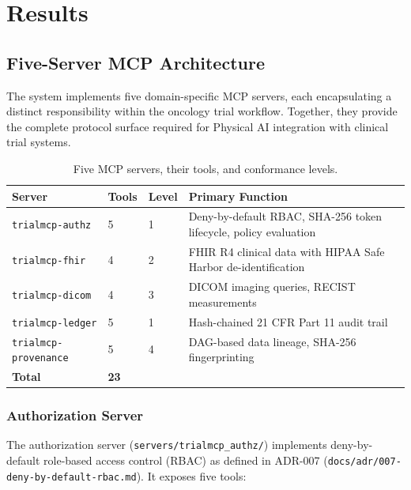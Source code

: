\section{Results}
\label{sec:results}

\subsection{Five-Server MCP Architecture}

The system implements five domain-specific MCP servers, each encapsulating a distinct responsibility within the oncology trial workflow. Together, they provide the complete protocol surface required for Physical AI integration with clinical trial systems.

\begin{table}[H]
\centering
\caption{Five MCP servers, their tools, and conformance levels.}
\label{tab:five-servers}
\footnotesize
\begin{tabularx}{\textwidth}{@{}L{3.2cm}C{0.8cm}C{1.0cm}L{6.8cm}@{}}
\toprule
\textbf{Server} & \textbf{Tools} & \textbf{Level} & \textbf{Primary Function} \\
\midrule
\texttt{trialmcp-authz} & 5 & 1 & Deny-by-default RBAC, SHA-256 token lifecycle, policy evaluation \\
\texttt{trialmcp-fhir} & 4 & 2 & FHIR R4 clinical data with HIPAA Safe Harbor de-identification \\
\texttt{trialmcp-dicom} & 4 & 3 & DICOM imaging queries, RECIST~\cite{eisenhauer2009recist} measurements \\
\texttt{trialmcp-ledger} & 5 & 1 & Hash-chained 21 CFR Part 11 audit trail \\
\texttt{trialmcp-provenance} & 5 & 4 & DAG-based data lineage, SHA-256 fingerprinting \\
\midrule
\textbf{Total} & \textbf{23} & & \\
\bottomrule
\end{tabularx}
\end{table}

\subsubsection{Authorization Server}

The authorization server (\texttt{servers/trialmcp\_authz/}) implements deny-by-default role-based access control (RBAC) as defined in ADR-007 (\texttt{docs/adr/007-deny-by-default-rbac.md}). It exposes five tools:

